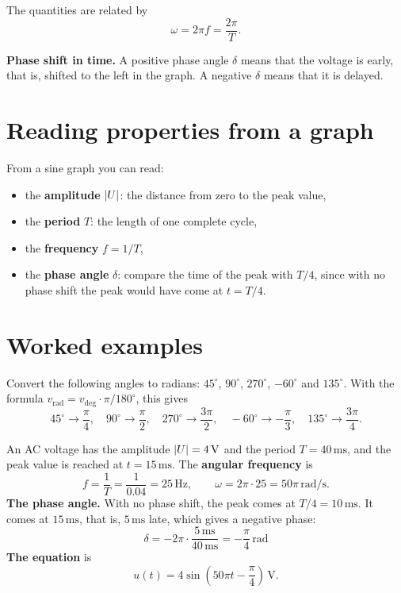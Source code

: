 The quantities are related by
\[
  \omega = 2\pi f = \frac{2\pi}{T}.
\]

\textbf{Phase shift in time.} A positive phase angle $\delta$ means that the voltage is early,
that is, shifted to the left in the graph. A negative $\delta$ means that it is delayed.

\section{Reading properties from a graph}
\label{c9:sec:graf}
From a sine graph you can read:
\begin{itemize}
  \item the \textbf{amplitude} $\lvert U\rvert$: the distance from zero to the peak value,
  \item the \textbf{period} $T$: the length of one complete cycle,
  \item the \textbf{frequency} $f = 1/T$,
  \item the \textbf{phase angle} $\delta$: compare the time of the peak with $T/4$, since with no
    phase shift the peak would have come at $t = T/4$.
\end{itemize}

\section{Worked examples}
\label{c9:sec:typexempel}

\begin{exempel}
Convert the following angles to radians: $45^{\circ}$, $90^{\circ}$, $270^{\circ}$, $-60^{\circ}$
and $135^{\circ}$. With the formula $v_{\text{rad}} = v_{\text{deg}} \cdot \pi/180^{\circ}$, this
gives
\[
  45^{\circ} \to \frac{\pi}{4}, \quad 90^{\circ} \to \frac{\pi}{2}, \quad
  270^{\circ} \to \frac{3\pi}{2}, \quad -60^{\circ} \to -\frac{\pi}{3}, \quad
  135^{\circ} \to \frac{3\pi}{4}.
\]
\end{exempel}

\begin{exempel}
An AC voltage has the amplitude $\lvert U\rvert = 4\,\text{V}$ and the period $T = 40\,\text{ms}$, and the
peak value is reached at $t = 15\,\text{ms}$. The \textbf{angular frequency} is
\[
  f = \frac{1}{T} = \frac{1}{0.04} = 25\,\text{Hz}, \qquad
  \omega = 2\pi \cdot 25 = 50\pi\,\text{rad/s}.
\]
\textbf{The phase angle.} With no phase shift, the peak comes at $T/4 = 10\,\text{ms}$. It comes at
$15\,\text{ms}$, that is, $5\,\text{ms}$ late, which gives a negative phase:
\[
  \delta = -2\pi \cdot \frac{5\,\text{ms}}{40\,\text{ms}} = -\frac{\pi}{4}\,\text{rad}
\]
\textbf{The equation} is
\[
  u(t) = 4\sin\left(50\pi t - \frac{\pi}{4}\right)\,\text{V}.
\]
\end{exempel}

